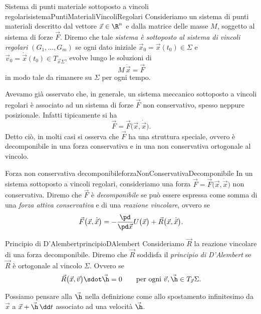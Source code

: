 \begin{defn}{Sistema di punti materiale sottoposto a vincoli regolari}{sistemaPuntiMaterialiVincoliRegolari}
	Consideriamo un sistema di punti materiali descritto dal vettore \(\vec{x}\in\R^n\) e dalla matrice delle masse \(M\), soggetto al sistema di forze \(\vec{F}\).
	Diremo che tale \emph{sistema è sottoposto al sistema di vincoli regolari} \((G_1,\ldots,G_m)\) se ogni dato iniziale \(\vec{x}_0 = \vec{x}(t_0)\in\Sigma\) e \(\vec{v}_0=\dot{\vec{x}}(t_0)\in T_{\vec{x}\Sigma}\), evolve lungo le soluzioni di
	\[
		M\,\ddot{\vec{x}} = \vec{F}
	\]
	in modo tale da rimanere su \(\Sigma\) per ogni tempo.
\end{defn}

\begin{oss}
	Avevamo già osservato che, in generale, un sistema meccanico sottoposto a vincoli regolari è associato ad un sistema di forze \(\vec{F}\) non conservativo, spesso neppure posizionale.
	Infatti tipicamente si ha
	\[
		\vec{F} = \vec{F}\big(\vec{x},\dot{\vec{x}}\big).
	\]
	Detto ciò, in molti casi si osserva che \(\vec{F}\) ha una struttura speciale, ovvero è decomponibile in una forza conservativa e in una non conservativa ortogonale al vincolo.
\end{oss}

\begin{defn}{Forza non conservativa decomponibile}{forzaNonConservativaDecomponibile}
	In un sistema sottoposto a vincoli regolari, consideriamo una forza \(\vec{F}=\vec{F}\big(\vec{x},\dot{\vec{x}}\big)\) non conservativa.
	Diremo che \(\vec{F}\) è \emph{decomponibile} se può essere espressa come somma di una \emph{forza attiva conservativa} e di una \emph{reazione vincolare}, ovvero se
	\[
		\vec{F}\big(\vec{x},\dot{\vec{x}}\big) = -\frac{\pd}{\pd\vec{x}}U\big(\vec{x}\big) + \vec{R}\big(\vec{x},\dot{\vec{x}}\big).
	\]
\end{defn}

\begin{defn}{Principio di D'Alembert}{principioDAlembert}
	Consideriamo \(\vec{R}\) la reazione vincolare di una forza decomponibile.
	Diremo che \(\vec{R}\) soddisfa il \emph{principio di D'Alembert} se \(\vec{R}\) è ortogonale al vincolo \(\Sigma\). Ovvero se
	\[
		\vec{R}\big(\vec{x},\vec{v}\big) \sdot \vec{\h} = 0 \qquad\text{per ogni }\vec{v},\vec{\h} \in T_{\vec{x}}\Sigma.
	\]
\end{defn}

\begin{oss}
	Possiamo pensare alla \(\vec{\h}\) nella definizione come allo spostamento infinitesimo da \(\vec{x}\) a \(\vec{x}+\vec{\h}\,\dd t\) associato ad una velocità \(\vec{\h}\).
\end{oss}

